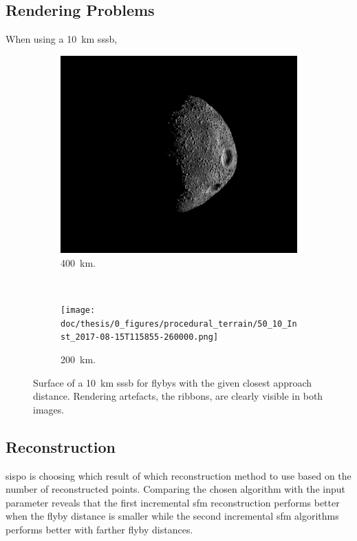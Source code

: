 \subsection{Rendering Problems}
When using a \SI{10}{\kilo\meter} \gls{sssb}, 
\begin{figure}[htb]
    \centering
        \begin{subfigure}[b]{0.75\textwidth}
            \centering
                \includegraphics[width=\textwidth]{doc/thesis/0_figures/procedural_terrain/50_10_Inst_2017-08-15T115755-845000.png}
            \caption{\SI{400}{\kilo\meter}.}
            \label{fig:img_procedural_500}
        \end{subfigure}
        \\
        \begin{subfigure}[b]{0.75\textwidth}
            \centering
                \texttt{[image: doc/thesis/0\_figures/procedural\_terrain/50\_10\_Inst\_2017-08-15T115855-260000.png]}
            \caption{\SI{200}{\kilo\meter}.}
            \label{fig:img_procedural_100}
        \end{subfigure}
    \caption{Surface of a \SI{10}{\kilo\meter} \gls{sssb} for flybys with the given closest approach distance. Rendering artefacts, the ribbons, are clearly visible in both images.}
    \label{fig:img_procedural_10k}
\end{figure}

\subsection{Reconstruction}
\gls{sispo} is choosing which result of which reconstruction method to use based on the number of reconstructed points. Comparing the chosen algorithm with the input parameter reveals that the first incremental \gls{sfm} reconstruction performs better when the flyby distance is smaller while the second incremental \gls{sfm} algorithms performs better with farther flyby distances.

